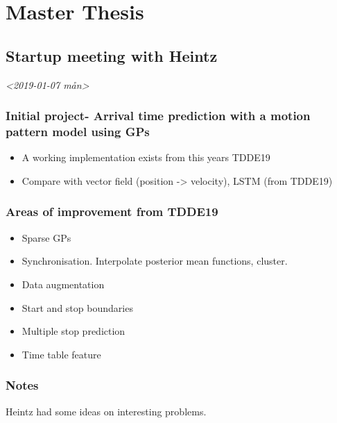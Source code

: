 \documentclass[11pt]{article}
\author{Sebastian}
\date{\today}
\title{}
\begin{document}
\tableofcontents

\section{Master Thesis}
\label{sec:orgab6ece1}

\subsection{Startup meeting with Heintz}
\label{sec:orge042a7d}
\textit{<2019-01-07 mån>   }   
\subsubsection{Initial project- Arrival time prediction with a motion pattern model using GPs}
\label{sec:orgbba6c41}
\begin{itemize}
\item A working implementation exists from this years TDDE19
\item Compare with vector field (position -> velocity), LSTM (from TDDE19)
\end{itemize}

\subsubsection{Areas of improvement from TDDE19}
\label{sec:org3d4f12b}
\begin{itemize}
\item Sparse GPs
\item Synchronisation. Interpolate posterior mean functions, cluster.
\item Data augmentation
\item Start and stop boundaries
\item Multiple stop prediction
\item Time table feature
\end{itemize}

\subsubsection{Notes}
\label{sec:orgbc6a324}
Heintz had some ideas on interesting problems.
\end{document}
